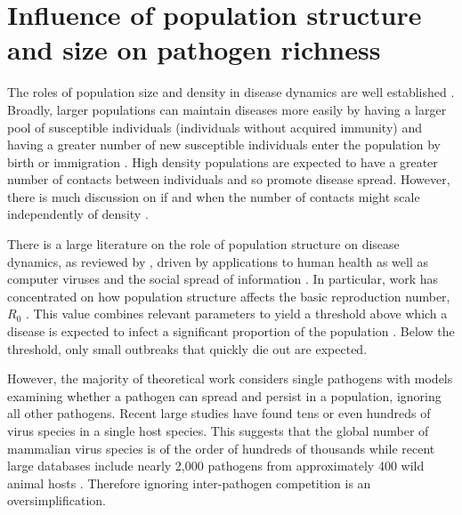 \section{Influence of population structure and size on pathogen richness}




The roles of population size and density in disease dynamics are well established \cite{may1979population, anderson1979population, heesterbeek2002brief, lloyd2005should}.
Broadly, larger populations can maintain diseases more easily by having a larger pool of susceptible individuals (individuals without acquired immunity) and having a greater number of new susceptible individuals enter the population by birth or immigration \cite{may1979population, anderson1979population}.
High density populations are expected to have a greater number of contacts between individuals and so promote disease spread.
However, there is much discussion on if and when the number of contacts might scale independently of density \cite{mccallum2001should}.


There is a large literature on the role of population structure on disease dynamics, as reviewed by \textcite{pastor2015epidemic}, driven by applications to human health as well as computer viruses \cite{pastor2001epidemic} and the social spread of information \cite{goffman1964generalization}.
In particular, work has concentrated on how population structure affects the basic reproduction number, $R_0$ \cite{colizza2007invasion, barthelemy2010fluctuation, wu2013threshold, may2001infection, pastor2001epidemic}. 
This value combines relevant parameters to yield a threshold above which a disease is expected to infect a significant proportion of the population \cite{may1979population, anderson1979population}.
Below the threshold, only small outbreaks that quickly die out are expected.


However, the majority of theoretical work considers single pathogens with models examining whether a pathogen can spread and persist in a population, ignoring all other pathogens.
Recent large studies have found tens \cite{anthony2013strategy} or even hundreds \cite{anthony2015non} of virus species in a single host species.
This suggests that the global number of mammalian virus species is of the order of hundreds of thousands \cite{anthony2013strategy} while recent large databases include nearly 2,000 pathogens from approximately 400 wild animal hosts \cite{wardeh2015database}.
Therefore ignoring inter-pathogen competition is an oversimplification.

